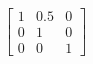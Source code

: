 \documentclass[preview]{standalone}
\begin{document}
\begin{align*}
\begin{bmatrix} 1 & 0.5 & 0 \\ 0 & 1 & 0 \\ 0 & 0 & 1 \end{bmatrix}
\end{align*}
\end{document}
